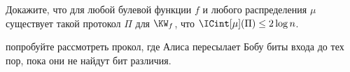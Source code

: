Докажите, что для любой булевой функции $f$ и любого распределения $\mu$ существует такой протокол $\Pi$
для $\KW_f$, что $\ICint[\mu](\Pi) \le 2 \log n$.

 попробуйте рассмотреть прокол, где Алиса пересылает Бобу биты входа до тех пор,
пока они не найдут бит различия.
